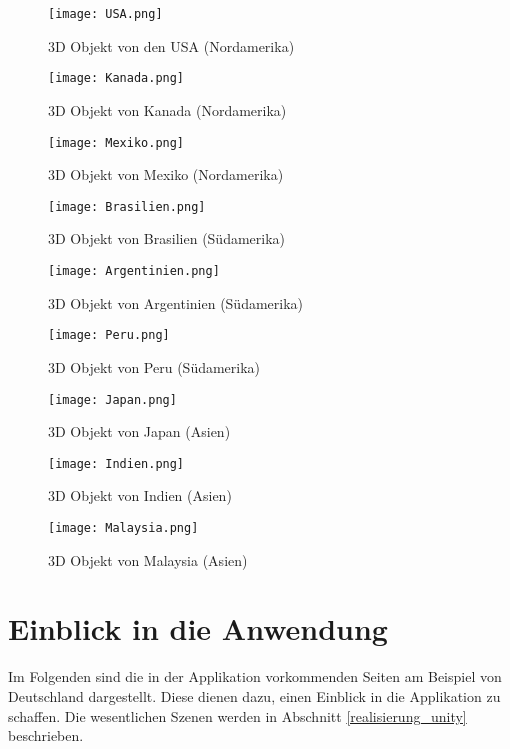 \begin{figure}[!htb]
  \texttt{[image: USA.png]}
  \caption{3D Objekt von den USA (Nordamerika)}\label{fig:usa}
\endminipage\hfill
{}
  \texttt{[image: Kanada.png]}
  \caption{3D Objekt von Kanada (Nordamerika)}\label{fig:kanada}
\endminipage\hfill
\end{figure}

\begin{figure}[!htb]
  \texttt{[image: Mexiko.png]}
  \caption{3D Objekt von Mexiko (Nordamerika)}\label{fig:mexiko}
\endminipage\hfill
{}
  \texttt{[image: Brasilien.png]}
  \caption{3D Objekt von Brasilien (Südamerika)}\label{fig:brasilien}
\endminipage\hfill
\end{figure}

\begin{figure}[!htb]
  \texttt{[image: Argentinien.png]}
  \caption{3D Objekt von Argentinien (Südamerika)}\label{fig:argentinien}
\endminipage\hfill
{}
  \texttt{[image: Peru.png]}
  \caption{3D Objekt von Peru (Südamerika)}\label{fig:peru}
\endminipage\hfill
\end{figure}

\begin{figure}[!htb]
  \texttt{[image: Japan.png]}
  \caption{3D Objekt von Japan (Asien)}\label{fig:japan}
\endminipage\hfill
{}
  \texttt{[image: Indien.png]}
  \caption{3D Objekt von Indien (Asien)}\label{fig:indien}
\endminipage\hfill
\end{figure}

\begin{figure}[!htb]
  \texttt{[image: Malaysia.png]}
  \caption{3D Objekt von Malaysia (Asien)}\label{fig:malaysia}
\endminipage\hfill
\end{figure}

\section{Einblick in die Anwendung}\label{einblick}
Im Folgenden sind die in der Applikation vorkommenden Seiten am Beispiel von Deutschland dargestellt. Diese dienen dazu, einen Einblick in die Applikation zu schaffen. Die wesentlichen Szenen werden in Abschnitt \ref{realisierung_unity} beschrieben.

